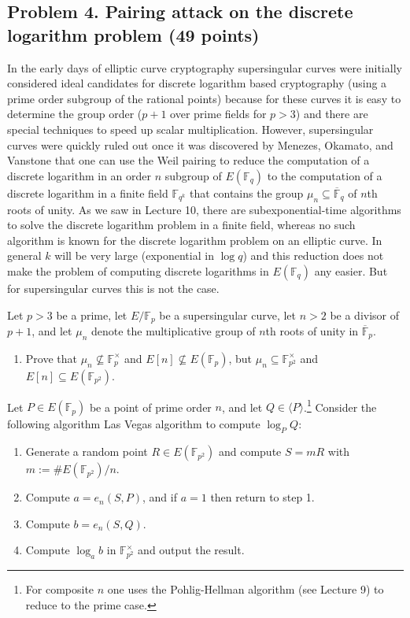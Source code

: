 \documentclass[11pt]{article}
\newcommand{\Fp}{\mathbb{F}_p}
\newcommand{\Fptwo}{\mathbb{F}_{p^2}}
\newcommand{\Fpbar}{\overline{\mathbb{F}}_p}
\newcommand{\Fq}{\mathbb{F}_q}
\newcommand{\Fqbar}{\overline{\mathbb{F}}_q}
\newcommand{\F}{\mathbb{F}}
\theoremstyle{definition}
\begin{document}
\subsection*{Problem 4. Pairing attack on the discrete logarithm problem (49 points)}
In the early days of elliptic curve cryptography supersingular curves were initially considered ideal candidates for discrete logarithm based cryptography (using a prime order subgroup of the rational points) because for these curves it is easy to determine the group order ($p+1$ over prime fields for $p>3$) and there are special techniques to speed up scalar multiplication.
However, supersingular curves were quickly ruled out once it was discovered by Menezes, Okamato, and Vanstone \cite{MOV} that one can use the Weil pairing to reduce the computation of a discrete logarithm in an order $n$ subgroup of $E(\Fq)$ to the computation of a discrete logarithm in a finite field $\F_{q^k}$ that contains the group $\mu_n\subseteq \Fqbar$ of $n$th roots of unity.
As we saw in Lecture 10, there are subexponential-time algorithms to solve the discrete logarithm problem in a finite field, whereas no such algorithm is known for the discrete logarithm problem on an elliptic curve.
In general $k$ will be very large (exponential in $\log q$) and this reduction does not make the problem of computing discrete logarithms in $E(\Fq)$ any easier.  But for supersingular curves this is not the case.

Let $p>3$ be a prime, let $E/\Fp$ be a supersingular curve, let $n>2$ be a divisor of $p+1$, and let $\mu_n$ denote the multiplicative group of $n$th roots of unity in $\Fpbar$.

\begin{enumerate}[{\bf(a)}]
\item Prove that $\mu_n\not\subseteq \Fp^\times$ and $E[n]\not\subseteq E(\Fp)$, but $\mu_n\subseteq \Fptwo^\times$ and $E[n]\subseteq E(\Fptwo)$.
\end{enumerate}

Let $P\in E(\Fp)$ be a point of prime order $n$, and let $Q\in \langle P\rangle$.\footnote{For composite $n$ one uses the Pohlig-Hellman algorithm (see Lecture 9) to reduce to the prime case.}
Consider the following algorithm Las Vegas algorithm to compute $\log_P Q$:
\begin{enumerate}
\setlength{\itemsep}{0pt}
\item Generate a random point $R\in E(\F_{p^2})$ and compute $S=mR$ with $m:=\#E(\F_{p^2})/n$.
\item Compute $a=e_n(S,P)$, and if $a=1$ then return to step 1.
\item Compute $b=e_n(S,Q)$.
\item Compute $\log_a b$ in $\F_{p^2}^\times$ and output the result.
\end{enumerate}
\end{document}
